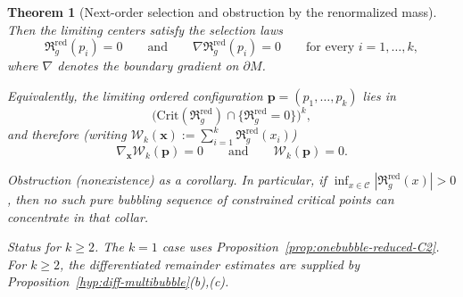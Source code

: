 \documentclass[11pt,reqno,a4paper]{amsart}
\numberwithin{equation}{section}
\theoremstyle{plain}
\newtheorem{theorem}{Theorem}[section]
\theoremstyle{remark}
\theoremstyle{plain}
\begin{document}
\begin{theorem}[Next-order selection and obstruction by the renormalized mass]
Then the limiting centers satisfy the \emph{selection laws}
\begin{equation}\label{eq:threshold-next-R-vanish}
\mathfrak R_g^{\mathrm{red}}(p_i)=0
\qquad\text{and}\qquad
\nabla \mathfrak R_g^{\mathrm{red}}(p_i)=0
\qquad\text{for every }i=1,\dots,k,
\end{equation}
where $\nabla$ denotes the boundary gradient on $\partial M$.

Equivalently, the limiting ordered configuration $\mathbf p=(p_1,\dots,p_k)$ lies in
\[
\big(\mathrm{Crit}(\mathfrak R_g^{\mathrm{red}})\cap\{\mathfrak R_g^{\mathrm{red}}=0\}\big)^k,
\]
and therefore (writing $\mathcal W_k(\mathbf x):=\sum_{i=1}^k\mathfrak R_g^{\mathrm{red}}(x_i)$)
\[
\nabla_{\mathbf x}\mathcal W_k(\mathbf p)=0
\qquad\text{and}\qquad
\mathcal W_k(\mathbf p)=0.
\]

\smallskip
\noindent\emph{Obstruction (nonexistence) as a corollary.}
In particular, if $\inf_{x\in\mathcal C}|\mathfrak R_g^{\mathrm{red}}(x)|>0$, then no such pure bubbling sequence of
constrained critical points can concentrate in that collar.

\smallskip
\noindent\emph{Status for $k\ge2$.}
The $k=1$ case uses Proposition~\ref{prop:onebubble-reduced-C2}. For $k\ge2$, the
differentiated remainder estimates are supplied by
Proposition~\ref{hyp:diff-multibubble}\textup{(b),(c)}.
\end{theorem}
\end{document}
